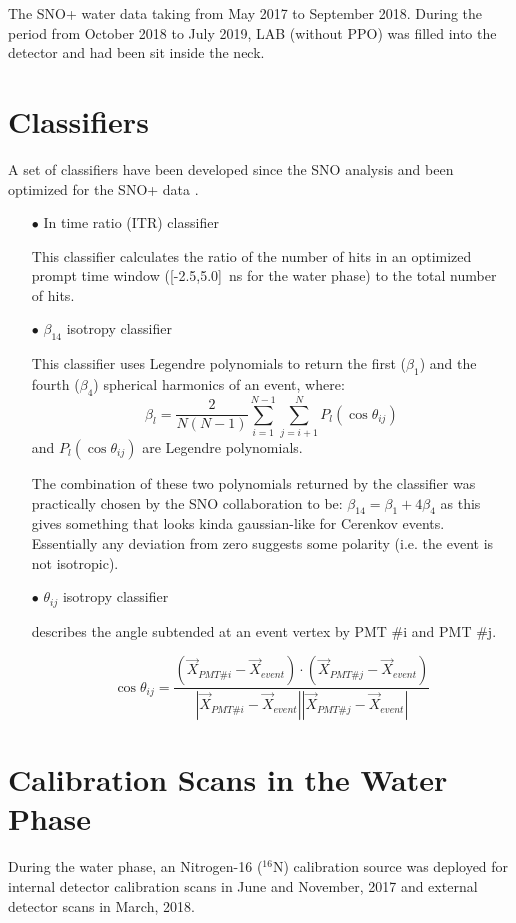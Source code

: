 The SNO+ water data taking from May 2017 to September 2018. During the period from October 2018 to July 2019, LAB (without PPO) was filled into the detector and had been sit inside the neck.

\section{Classifiers}

A set of classifiers have been developed since the SNO analysis and been optimized for the SNO+ data \cite{highlevel}.


\begin{itemize}

\item[$\bullet$] In time ratio (ITR) classifier

This classifier calculates the ratio of the number of hits in an optimized prompt time window ([-2.5,5.0]~ns for the water phase) to the total number of hits.


\item[$\bullet$] $\beta_{14}$ isotropy classifier

This classifier uses Legendre polynomials to return the	first ($\beta_1$) and the fourth ($\beta_4$) spherical	harmonics of an event, where:
\[
\beta_l = \frac{2}{N(N-1)}\sum_{i=1}^{N-1}\sum_{j=i+1}^N P_l(\cos\theta_{ij})
\]
and $P_l(\cos\theta_{ij})$ are Legendre polynomials.

The	combination	of these two polynomials returned by the classifier	was	
practically	chosen by the SNO collaboration	to be: $\beta_{14}=\beta_1+4\beta_4$
as	this gives	something	that	looks	kinda gaussian-like	for	Cerenkov	events.	
Essentially	any	deviation	from	zero	suggests	some	polarity	(i.e.	the	event	is	not	
isotropic).	



\item[$\bullet$] $\theta_{ij}$ isotropy classifier 

describes the angle subtended at an event vertex by PMT \#i and PMT \#j.

\[
\cos\theta_{ij}=\frac{(\vec{X}_{PMT\#i}- \vec{X}_{event})\cdot (\vec{X}_{PMT\#j}- \vec{X}_{event})}{|\vec{X}_{PMT\#i}- \vec{X}_{event}||\vec{X}_{PMT\#j}- \vec{X}_{event}|}
\]
\end{itemize}


\section{ Calibration Scans in the Water Phase}
During the water phase, an Nitrogen-16 ($^{16}$N) calibration source was deployed for internal detector calibration scans in June and November, 2017 and external detector scans in March, 2018. 


